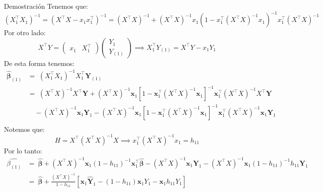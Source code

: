 \documentclass[a4paper,11pt]{article}
\begin{document}
\begin{demostracion}{Demostración}
    Tenemos que:
    \[
        (X_1^\top X_1)^{-1} =(X^\top X-x_1x_1^\top)^{-1}= (X^\top X)^{-1}+(X^\top X)^{-1}x_1(1-x_1^\top (X^\top X)^{-1}x_1)^{-1}x_1^\top(X^\top X)^{-1}
    \]
    Por otro lado:
    \[
        X^\top Y=\begin{pmatrix}
            x_1 & X_1^\top
        \end{pmatrix}\begin{pmatrix}
            Y_1 \\
            Y_{(1)}
        \end{pmatrix}\implies X_1^\top Y_{(1)}=X^\top Y-x_{1}Y_1
    \]
    De esta forma tenemos:
    \begin{align*}
        \widehat{\boldsymbol{\beta}}_{(1)} & = \;(X_1^{\top}X_1)^{-1}X_1^{\top}\boldsymbol{Y}_{(1)}                                                                                                                                                                                      \\[5pt]
                                           & = \; (X^{\top}X)^{-1}X^{\top}\boldsymbol{Y}+(X^{\top}X)^{-1}\boldsymbol{x}_1\left[1-\boldsymbol{x}_1^{\top}(X^{\top}X)^{-1}\boldsymbol{x}_1\right]^{-1}\boldsymbol{x}_1^{\top}(X^{\top}X)^{-1}X^{\top}\boldsymbol{Y}                        \\
                                           & \quad -(X^{\top}X)^{-1}\boldsymbol{x}_1\boldsymbol{Y}_1 -(X^{\top}X)^{-1}\boldsymbol{x}_1\left[1-\boldsymbol{x}_1^{\top}(X^{\top}X)^{-1}\boldsymbol{x}_1\right]^{-1}\boldsymbol{x}_1^{\top}(X^{\top}X)^{-1}\boldsymbol{x}_1\boldsymbol{Y}_1 \\[10pt]
    \end{align*}
    Notemos que:
    \[
        H=X^\top (X^\top X)^{-1}X\implies x_1^\top(X^\top X)^{-1}x_1=h_{11}
    \]
    Por lo tanto:
    \begin{align*}
        \hat{\beta_{(1)} } & = \; \widehat{\boldsymbol{\beta}}+(X^{\top}X)^{-1}\boldsymbol{x}_1(1-h_{11})^{-1}\boldsymbol{x}_1^{\top}\widehat{\boldsymbol{\beta}}
        -(X^{\top}X)^{-1}\boldsymbol{x}_1\boldsymbol{Y}_1 -(X^{\top}X)^{-1}\boldsymbol{x}_1(1-h_{11})^{-1}h_{11}\boldsymbol{Y}_1                                  \\[5pt]
                           & = \; \widehat{\boldsymbol{\beta}}+\frac{(X^{\top}X)^{-1}}{1-h_{11}} \left[
        \boldsymbol{x}_1\widehat{\boldsymbol{Y}}_1 - (1-h_{11})\boldsymbol{x}_1Y_1 - \boldsymbol{x}_1h_{11}Y_1\right]                                             \\[5pt]

\end{align*}
\end{demostracion}
\end{document}
